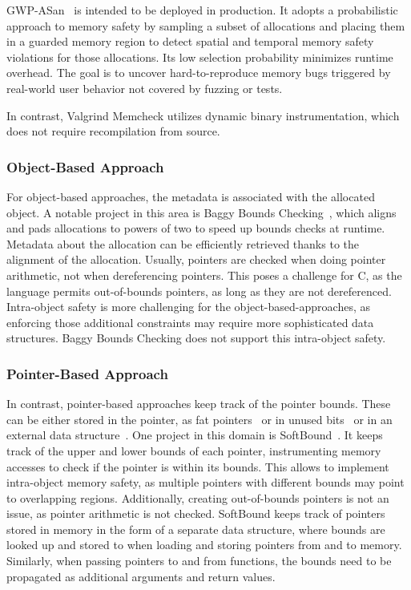 GWP-ASan~\cite{serebryany2023gwp} is intended to be deployed in production.
It adopts a probabilistic approach to memory safety by sampling a subset of allocations and placing them in a guarded memory region to detect spatial and temporal memory safety violations for those allocations.
Its low selection probability minimizes runtime overhead.
The goal is to uncover hard-to-reproduce memory bugs triggered by real-world user behavior not covered by fuzzing or tests.

In contrast, Valgrind Memcheck utilizes dynamic binary instrumentation, which does not require recompilation from source.

\subsubsection{Object-Based Approach}

For object-based approaches, the metadata is associated with the allocated object.
A notable project in this area is Baggy Bounds Checking~\cite{akritidis2009baggy}, which aligns and pads allocations to powers of two to speed up bounds checks at runtime.
Metadata about the allocation can be efficiently retrieved thanks to the alignment of the allocation.
Usually, pointers are checked when doing pointer arithmetic, not when dereferencing pointers.
This poses a challenge for C, as the language permits out-of-bounds pointers, as long as they are not dereferenced.
Intra-object safety is more challenging for the object-based-approaches, as enforcing those additional constraints may require more sophisticated data structures.
Baggy Bounds Checking does not support this intra-object safety.

\subsubsection{Pointer-Based Approach}

In contrast, pointer-based approaches keep track of the pointer bounds.
These can be either stored in the pointer, as fat pointers~\cite{watson_cheri_2020} or in unused bits~\cite{serebryany2018memory} or in an external data structure~\cite{nagarakatte2009softbound}.
One project in this domain is SoftBound~\cite{nagarakatte2009softbound}.
It keeps track of the upper and lower bounds of each pointer, instrumenting memory accesses to check if the pointer is within its bounds.
This allows to implement intra-object memory safety, as multiple pointers with different bounds may point to overlapping regions.
Additionally, creating out-of-bounds pointers is not an issue, as pointer arithmetic is not checked.
SoftBound keeps track of pointers stored in memory in the form of a separate data structure, where bounds are looked up and stored to when loading and storing pointers from and to memory.
Similarly, when passing pointers to and from functions, the bounds need to be propagated as additional arguments and return values.

